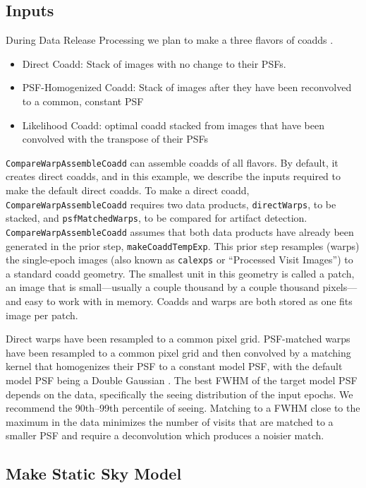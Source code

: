 \documentclass[DM,authoryear,toc]{lsstdoc}
\begin{document}
\subsection{Inputs}
\label{sec:inputs}

During Data Release Processing we plan to make a three flavors of coadds \citep{DMTN-015}.
\begin{itemize}
\item Direct Coadd: Stack of images with no change to their PSFs.
\item  PSF-Homogenized Coadd: Stack of images after they have been reconvolved to a common, constant PSF
\item  Likelihood Coadd: optimal coadd stacked from images that have been convolved with the transpose of their PSFs
\end{itemize}

 \texttt{CompareWarpAssembleCoadd} can assemble coadds of all flavors.
 By default, it creates direct coadds, and in this example, we describe the inputs required to make the default direct coadds.
To make a direct coadd, \texttt{CompareWarpAssembleCoadd} requires two data products, \texttt{directWarps}, to be stacked, and \texttt{psfMatchedWarps}, to be compared for artifact detection.
\texttt{CompareWarpAssembleCoadd}  assumes that both data products have already been generated in the prior step, \texttt{makeCoaddTempExp}.
This prior step resamples (warps) the single-epoch images (also known as \texttt{calexps} or ``Processed Visit Images'') to a standard coadd geometry.
The smallest unit in this geometry is called a patch, an image that is small---usually a couple thousand by a couple thousand pixels---and easy to work with in memory.
Coadds and warps are both stored as one fits image per patch.

Direct warps have been resampled to a common pixel grid.
PSF-matched warps have been resampled to a common pixel grid and then convolved by a matching kernel that homogenizes their PSF to a constant model PSF, with the default model PSF being a Double Gaussian \citep{LDM-151}.
The best FWHM of the target model PSF depends on the data, specifically the seeing distribution of the input epochs.
We recommend the 90th--99th percentile of seeing.
Matching to a FWHM close to the maximum in the data minimizes the number of visits that are matched to a smaller PSF  and require a deconvolution which produces a noisier match.

\subsection{Make Static Sky Model}
\end{document}
